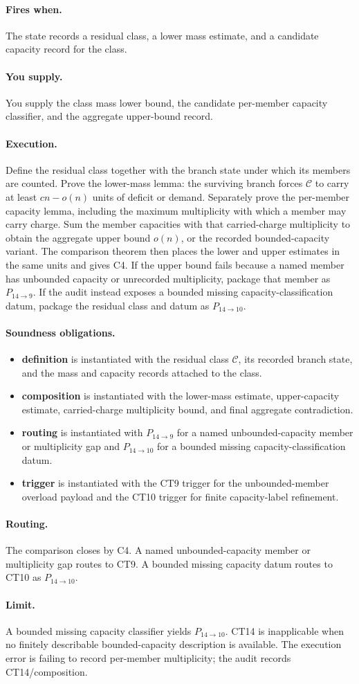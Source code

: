\documentclass[
  11pt,
]{article}
\providecommand{\tightlist}{%
  \setlength{\itemsep}{0pt}\setlength{\parskip}{0pt}}
\theoremstyle{definition}
\newcommand{\ctpar}[1]{\paragraph{#1.}}
\begin{document}
\ctpar{Fires when}
The state records a residual class, a lower mass estimate, and a
candidate capacity record for the class.

\ctpar{You supply}
You supply the class mass lower bound, the candidate per-member capacity
classifier, and the aggregate upper-bound record.

\ctpar{Execution}
Define the residual class together with the branch state under which its
members are counted.  Prove the lower-mass lemma: the surviving branch
forces \(\mathcal C\) to carry at least \(cn-o(n)\) units of deficit or
demand.  Separately prove the per-member capacity lemma, including the
maximum multiplicity with which a member may carry charge.  Sum the
member capacities with that carried-charge multiplicity to obtain the
aggregate upper bound \(o(n)\), or the recorded bounded-capacity variant.
The comparison theorem then places the lower and upper estimates in the
same units and gives C4.  If the upper bound fails because a named
member has unbounded capacity or unrecorded multiplicity, package that
member as \(P_{14\to9}\).  If the audit instead exposes a bounded missing
capacity-classification datum, package the residual class and datum as
\(P_{14\to10}\).

\ctpar{Soundness obligations}
\begin{itemize}
\tightlist
\item \textbf{definition} is instantiated with the residual class \(\mathcal C\), its recorded branch state, and the mass and capacity records attached to the class.
\item \textbf{composition} is instantiated with the lower-mass estimate, upper-capacity estimate, carried-charge multiplicity bound, and final aggregate contradiction.
\item \textbf{routing} is instantiated with \(P_{14\to9}\) for a named unbounded-capacity member or multiplicity gap and \(P_{14\to10}\) for a bounded missing capacity-classification datum.
\item \textbf{trigger} is instantiated with the CT9 trigger for the unbounded-member overload payload and the CT10 trigger for finite capacity-label refinement.
\end{itemize}

\ctpar{Routing}
The comparison closes by C4.  A named unbounded-capacity member or
multiplicity gap routes to CT9.  A bounded missing capacity datum routes
to CT10 as \(P_{14\to10}\).

\ctpar{Limit}
A bounded missing capacity classifier yields \(P_{14\to10}\). CT14 is
inapplicable when no finitely describable bounded-capacity description is
available. The execution error is failing to record per-member
multiplicity; the audit records CT14/composition.
\end{document}
